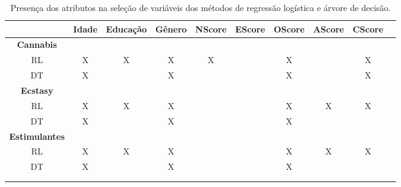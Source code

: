 \begin{table}[H]
\centering
\addtolength{\leftskip}{-0.8cm}
\begin{tabular}{cccccccccc}
\hline
 & Idade & Educação & Gênero & NScore & EScore & OScore & AScore & CScore &  \\ \hline
\textbf{Cannabis} &  &  &  &  &  &  &  &  &  \\
RL & X & X & X & X &  & X  & &X &  \\
DT & X &  & X &  &  & X & &X &  \\ \hline
\textbf{Ecstasy} &  &  &  &  &  &  &  &  &  \\
RL & X & X & X &  &  & X  & X &X &  \\
DT & X &  & X &  &  & X  & & &  \\ \hline
\textbf{Estimulantes} &  &  &  &  &  &  &  &  &  \\
RL & X & X & X &  &  & X  & X &X &  \\
DT & X &  & X &  &  & X  & & &  \\ \hline
 &  &  &  &  &  &  &  &  &  \\
 &  &  &  &  &  &  &  &  & 
\end{tabular}
\caption{Presença dos atributos na seleção de variáveis dos métodos de regressão logística e árvore de decisão.}
\label{tabela_resultados_atributos}
\end{table}
